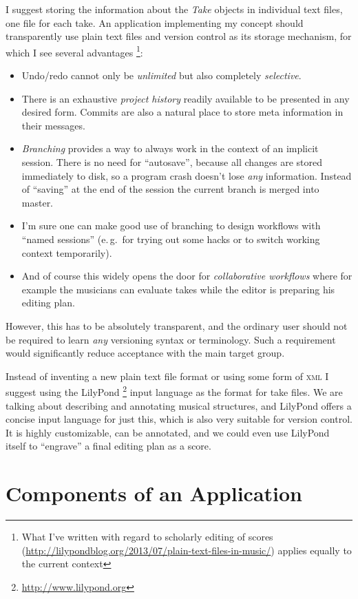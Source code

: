 \documentclass[11pt,a4paper]{article}
\begin{document}
I suggest storing the information about the \emph{Take} objects in individual text files, one file for each take.
An application implementing my concept should transparently use plain text files and version control as its storage mechanism, for which I see several advantages%
\footnote{What I've written with regard to scholarly editing of scores (\url{http://lilypondblog.org/2013/07/plain-text-files-in-music/}) applies equally to the current context}:
\begin{itemize}
\item Undo/redo cannot only be \emph{unlimited} but also completely \emph{selective}.
\item There is an exhaustive \emph{project history} readily available to be presented in any desired form.
Commits are also a natural place to store meta information in their messages.
\item \emph{Branching} provides a way to always work in the context of an implicit session.
There is no need for “autosave”, because all changes are stored immediately to disk, so a program crash doesn't lose \emph{any} information.
Instead of “saving” at the end of the session the current branch is merged into master.
\item I'm sure one can make good use of branching to design workflows with “named sessions” (e.\,g.\ for trying out some hacks or to switch working context temporarily).
\item And of course this widely opens the door for \emph{collaborative workflows} where for example the musicians can evaluate takes while the editor is preparing his editing plan.
\end{itemize}

However, this has to be absolutely transparent, and the ordinary user should not be required to learn \emph{any} versioning syntax or terminology.
Such a requirement would significantly reduce acceptance with the main target group.

\medskip
Instead of inventing a new plain text file format or using some form of \textsc{xml} I suggest using the LilyPond%
\footnote{\url{http://www.lilypond.org}}
input language as the format for take files.
We are talking about describing and annotating musical structures, and LilyPond offers a concise input language for just this, which is also very suitable for version control.
It is highly customizable, can be annotated, and we could even use LilyPond itself to “engrave” a final editing plan as a score.

\section{Components of an Application}
\end{document}
